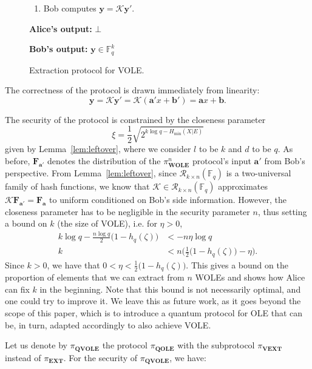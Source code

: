 \begin{figure}[h!]
\begin{tcolorbox}
\begin{enumerate}
    \item Bob computes $\bm{y} = \mathcal{K}\bm{y}'$.
\end{enumerate}

\textbf{Alice's output:} $\bot$

\textbf{Bob's output:} $\bm{y}\in \mathbb{F}^k_q$
        
        \end{tcolorbox}
\caption{Extraction protocol  for VOLE.}
\label{fig:vext}
\end{figure}


The correctness of the protocol is drawn immediately from linearity:
\begin{equation*}
\bm{y} = \mathcal{K} \bm{y}'
= \mathcal{K}(\bm{a}'x + \bm{b}')
= \bm{a}x + \bm{b}.
\end{equation*}

The security of the protocol is constrained by the closeness parameter $$\xi = \frac{1}{2}\sqrt{2^{k\log q - H_\text{min}(X|E)}}$$ given by Lemma~\ref{lem:leftover}, where we consider $l$ to be $k$ and $d$ to be $q$. As before, $\mathbf{F}_{\bm{a}'}$ denotes the distribution of the $\pi^n_{\textbf{WOLE}}$ protocol's input ${\bm{a}'}$ from Bob's perspective. From Lemma~\ref{lem:leftover}, since $\mathcal{R}_{k\times n}(\mathbb{F}_q)$ is a two-universal family of hash functions, we know that $\mathcal{K}\in \mathcal{R}_{k\times n}(\mathbb{F}_q)$ approximates $\mathcal{K}\mathbf{F}_{\bm{a}'} = \mathbf{F}_{\bm{a}}$ to uniform conditioned on Bob's side information. However, the closeness parameter has to be negligible in the security parameter $n$, thus setting a bound on $k$ (the size of VOLE), i.e. for $\eta > 0$,
\begin{align*}
k \log q - \frac{n \log q}{2}\big(1-h_{q}(\zeta)\big) &< -n \eta \log q\\
k &< n \Big(\frac{1}{2}\big(1-h_q(\zeta)\big) - \eta\Big).
\end{align*}
Since $k>0$, we have that  $ 0 < \eta < \frac{1}{2}\big(1-h_q(\zeta)\big)$. This gives a bound on the proportion of elements that we can extract from $n$ WOLEs  and  shows how Alice can fix $k$ in the beginning.  Note that this bound is not necessarily optimal, and one could try to improve it. We leave this as future work, as it goes beyond the scope of this paper, which is to introduce a quantum protocol for OLE that can be, in turn, adapted accordingly to also achieve VOLE.

Let us denote by $\mathcal{\pi}_{\textbf{QVOLE}}$ the protocol $\mathcal{\pi}_{\textbf{QOLE}}$ with the subprotocol $\mathcal{\pi}_{\textbf{VEXT}}$ instead of $\mathcal{\pi}_{\textbf{EXT}}$. For the security of $\mathcal{\pi}_{\textbf{QVOLE}}$, we have:

